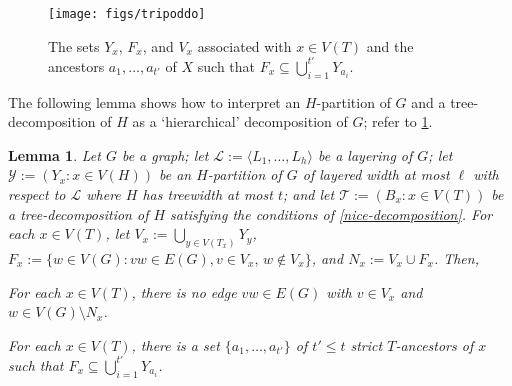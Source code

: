 \documentclass{patmorin}
\theoremstyle{plain}
\newtheorem{lem}[thm]{Lemma}
\theoremstyle{definition}
\newcommand{\note}[2]{\noindent{\color{red}[#1:~#2]}}
\newcommand{\referee}[2]{\noindent\textcolor{blue}{\framebox{\begin{minipage}{\textwidth} Ref \#{#1}: #2\end{minipage}}}}
\newcommand{\ylabel}[1]{\label{y:#1}}
\renewcommand{\le}{\leqslant}
\begin{document}



\begin{figure}[htbp]
  \begin{center}
    \texttt{[image: figs/tripoddo]}
  \end{center}
  \caption{The sets $Y_x$, $F_x$, and $V_x$ associated with $x\in V(T)$
  and the ancestors $a_1,\ldots,a_{t'}$ of $X$ such that $F_x \subseteq \bigcup_{i=1}^{t'} Y_{a_i}$.}
  \label{fig:generalized-tripod}
\end{figure}

The following lemma shows how to interpret an $H$-partition of $G$ and a tree-decomposition of $H$ as a `hierarchical' decomposition of $G$; refer to \cref{fig:generalized-tripod}.

\begin{lem}\label{generalized-tripod}
  Let $G$ be a graph; let $\mathcal{L}:=\langle L_1,\ldots,L_h\rangle$ be a layering of $G$; let $\mathcal{Y}:=(Y_x: x\in V(H))$ be an $H$-partition of $G$ of layered width at most $\ell$ with respect to $\mathcal{L}$ where $H$ has treewidth at most $t$; and let $\mathcal{T}:=(B_x:x\in V(T))$ be a tree-decomposition of $H$ satisfying the conditions of \cref{nice-decomposition}.  For each $x\in V(T)$, let $V_x := \bigcup_{y\in V(T_x)} Y_y$, $F_x:=\{w\in V(G): vw\in E(G), v\in V_x,\, w\not\in V_x\}$, and $N_x:=V_x\cup F_x$.  Then,
  \begin{compactenum}[(Y1)]
    \item\ylabel{separator} For each $x\in V(T)$, there is no edge $vw\in E(G)$ with $v\in V_x$ and $w\in V(G)\setminus N_x$.
    \item\ylabel{ancestor-edge} For each $x\in V(T)$, there is a set $\{a_1,\ldots,a_{t'}\}$ of $t'\le t$ strict $T$-ancestors of $x$ such that $F_x \subseteq \bigcup_{i=1}^{t'} Y_{a_i}$.
  \end{compactenum}
\end{lem}
\end{document}
